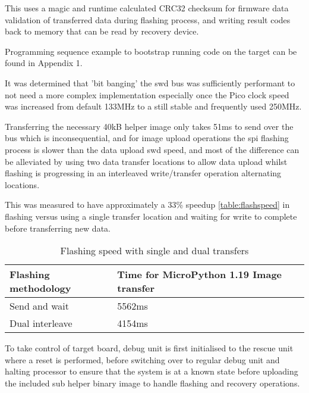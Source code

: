 This uses a \gls{magic} and runtime calculated CRC32 checksum for firmware data validation of transferred data during flashing process, and writing result codes back to memory that can be read by recovery device.

Programming sequence example to bootstrap running code on the target can be found in Appendix 1.

It was determined that 'bit banging' the \gls{swd} bus was sufficiently performant to not need a more complex implementation especially once the Pico clock speed was increased from default 133MHz to a still stable and frequently used 250MHz.

Transferring the necessary 40kB helper image only takes 51ms to send over the bus which is inconsequential, and for  image upload operations the \gls{spi} flashing process is slower than the data upload  \gls{swd} speed, and most of the difference can be alleviated by using two data transfer locations to allow data upload whilst flashing is progressing in an interleaved write/transfer operation alternating locations.

This was measured to have approximately a 33\% speedup \autoref{table:flashspeed} in flashing versus using a single transfer location and waiting for write to complete before transferring new data.

\begin{table}[h]
	\centering
	\caption{Flashing speed with single and dual transfers}%
	\vspace{-16.5pt}%
	
	\begin{tabular}{|l|l|}
		\hline
		Flashing methodology & Time for MicroPython 1.19 Image transfer  \\ \hline
		Send and wait & 5562ms \\ \hline
		Dual interleave & 4154ms \\ \hline
	\end{tabular}
	\label{table:flashspeed}
\end{table}

To take control of target board, debug unit is first initialised to the rescue unit where a reset is performed, before switching over to regular debug unit and halting processor to ensure that the system is at a known state before uploading the  included sub helper binary image to handle flashing and recovery operations.

